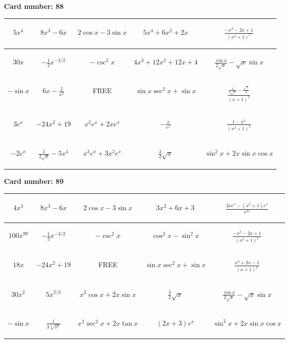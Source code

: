 \documentclass{article}
\newcommand{\entry}[1]{\begin{minipage}[t][2.75cm][t]{4cm} \vspace{1cm} \begin{center}#1\end{center} \end{minipage}}
\newcommand{\freespace}{\entry{FREE}}
\newcommand{\cardnumber}[1]{\noindent \textbf{Card number: #1} \bigskip}
\begin{document}
\pagebreak

\cardnumber{88}
\begin{center}
\begin{tabular}{|*{5}{c|}}
    \hline
    \entry{$5x^4$} & \entry{$8x^3 - 6x$} & \entry{$2 \cos x - 3 \sin x$} & \entry{$5x^4 + 6x^2 + 2x$} & \entry{$\frac{-x^2 - 2x + 1}{(x^2 + 1)^2}$} \\ \hline
    \entry{$30x$} & \entry{$-\frac{1}{2} x^{-3/2}$} & \entry{$-\csc^2 x$} & \entry{$4x^3 + 12x^2 + 12x + 4$} & \entry{$\frac{\cos x}{2 \sqrt{x}} - \sqrt{x} \sin x$} \\ \hline
    \entry{$-\sin x$} & \entry{$6x - \frac{2}{x^2}$} & \freespace & \entry{$\sin x \sec^2 x + \sin x$} & \entry{$\frac{\frac{1}{2 \sqrt{x}} - \frac{\sqrt{x}}{2}}{(x + 1)^2}$} \\ \hline
    \entry{$3e^x$} & \entry{$-24x^2 + 19$} & \entry{$x^2 e^x + 2x e^x$} & \entry{$-\frac{x}{e^x}$} & \entry{$\frac{1 - x^2}{(x^2 + 1)^2}$} \\ \hline
    \entry{$-2e^x$} & \entry{$\frac{1}{2\sqrt{x}} - 5x^4$} & \entry{$x^3 e^x + 3x^2 e^x$} & \entry{$\frac{3}{2} \sqrt{x}$} & \entry{$\sin^2 x + 2x \sin x \cos x$} \\ \hline
\end{tabular}
\end{center}

\pagebreak

\cardnumber{89}
\begin{center}
\begin{tabular}{|*{5}{c|}}
    \hline
    \entry{$4x^3$} & \entry{$8x^3 - 6x$} & \entry{$2 \cos x - 3 \sin x$} & \entry{$3x^2 + 6x + 3$} & \entry{$\frac{2x e^x - (x^2 + 1) e^x}{e^{2x}}$} \\ \hline
    \entry{$100x^{99}$} & \entry{$-\frac{1}{2} x^{-3/2}$} & \entry{$-\csc^2 x$} & \entry{$\cos^2 x - \sin^2 x$} & \entry{$\frac{-x^2 - 2x + 1}{(x^2 + 1)^2}$} \\ \hline
    \entry{$18x$} & \entry{$-24x^2 + 19$} & \freespace & \entry{$\sin x \sec^2 x + \sin x$} & \entry{$\frac{x^2 + 2x - 1}{(x + 1)^2}$} \\ \hline
    \entry{$30x^2$} & \entry{$5x^{2/3}$} & \entry{$x^2 \cos x + 2x \sin x$} & \entry{$\frac{3}{2} \sqrt{x}$} & \entry{$\frac{\cos x}{2 \sqrt{x}} - \sqrt{x} \sin x$} \\ \hline
    \entry{$-\sin x$} & \entry{$\frac{1}{3\sqrt[3]{x^2}}$} & \entry{$x^2 \sec^2 x + 2x \tan x$} & \entry{$(2x + 3) e^x$} & \entry{$\sin^2 x + 2x \sin x \cos x$} \\ \hline
\end{tabular}
\end{center}
\end{document}
